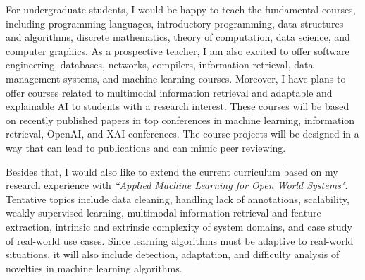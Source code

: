 For undergraduate students, I would be happy to teach the fundamental courses, including %
programming languages, introductory programming, data structures and algorithms, discrete mathematics, theory of computation, data science, and computer graphics. 
As a prospective teacher, I am also excited to offer software engineering, databases, networks, compilers, information retrieval, data management systems, and machine learning courses. 
%
Moreover, I have plans to offer courses related to multimodal information retrieval and adaptable and explainable AI to students with a research interest. 
These courses will be based on recently published papers in top conferences in machine learning, information retrieval, OpenAI, and XAI conferences. The course projects will be designed in a way that can lead to publications and can mimic peer reviewing. 
%

Besides that, I would also like to extend the current curriculum based on my research experience with \textit{``Applied Machine Learning for Open World Systems"}. Tentative topics include data cleaning, handling lack of annotations, scalability, weakly supervised learning, multimodal information retrieval and feature extraction, intrinsic and extrinsic complexity of system domains, and case study of real-world use cases. Since learning algorithms must be adaptive to real-world situations, it will also include detection, adaptation, and difficulty analysis of novelties in machine learning algorithms.
